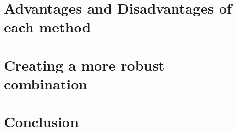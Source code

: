 \documentclass[]{article}
\begin{document}
\section{Advantages and Disadvantages of each method}
\subsection{}

\subsection{}

\subsection{}

\subsection{}

\subsection{}

\section{Creating a more robust combination}

\section{Conclusion}
\end{document}
